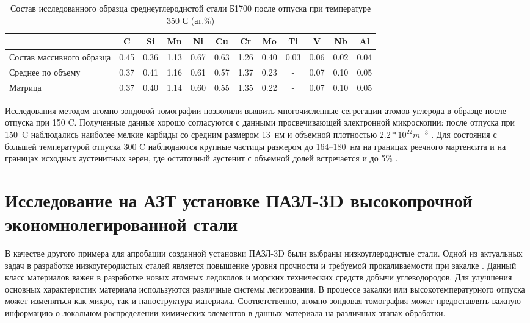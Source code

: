 \begin{table} [htbp]
	\centering
	\caption{Состав исследованного образца среднеуглеродистой стали Б1700 после отпуска при температуре 350 \textdegree С (ат.\%)}%
	\label{tab:SteelComposition350}%
	\begin{SingleSpace}
		\begin{tabular}{|p{3cm}| c | c | c | c | c | c | c | c | c | c | c |}
			\hline
			& C & Si & Mn & Ni & Cu & Cr & Mo & Ti & V & Nb & Al     \\ \hline
			Состав массивного образца     & 0.45 & 0.36 & 1.13 & 0.67 & 0.63 & 1.26 & 0.40 & 0.03 & 0.06 & 0.02 & 0.04   \\ \hline
			Среднее по объему   & 0.37 & 0.41 & 1.16 & 0.61 & 0.57 & 1.37 & 0.23 & - & 0.07 & 0.10 & 0.05   \\  \hline		
			Матрица   & 0.37 & 0.40 & 1.14 & 0.60 & 0.55 & 1.35 & 0.22 & - & 0.07 & 0.10 & 0.05   \\  \hline		
		\end{tabular}%
	\end{SingleSpace}
\end{table}
\FloatBarrier
Исследования методом атомно-зондовой томографии позволили выявить многочисленные сегрегации атомов углерода в образце после отпуска при 150 \textdegree C. Полученные данные хорошо согласуются с данными просвечивающей электронной микроскопии: после отпуска при 150~\textdegree C наблюдались наиболее мелкие карбиды со средним размером 13~нм и объемной плотностью $2.2*10^{22} m^{-3}$ \cite{scbibRyabov}. Для состояния  с большей температурой отпуска 300 \textdegree C наблюдаются крупные частицы размером до 164–180~нм на границах реечного мартенсита и на границах исходных аустенитных зерен, где остаточный аустенит с объемной долей встречается и до 5\% \cite{scbibRyabov}.

\FloatBarrier

\section{Исследование на АЗТ установке ПАЗЛ-3D высокопрочной экономнолегированной стали}\label{sec:ch4/sect3}

В качестве другого примера для апробации созданной установки ПАЗЛ-3D были выбраны низкоуглеродистые стали. Одной из актуальных задач в разработке низкоугеродистых сталей является повышение уровня прочности и требуемой прокаливаемости при закалке \cite{scbibGlubev}. Данный класс материалов важен в разработке новых атомных ледоколов и морских технических средств добычи углеводородов. Для улучшения основных характеристик материала используются различные системы легирования. В процессе закалки или высокотемпературного отпуска может изменяться как микро, так и наноструктура материала. Соответственно, атомно-зондовая томография может предоставлять важную информацию о локальном распределении химических элементов в данных материала на различных этапах обработки.

